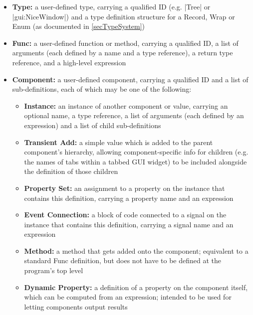 \documentclass[11pt]{report}
\begin{document}
\begin{itemize}
    \item \textbf{Type:} a user-defined type, carrying a qualified ID (e.g. |Tree| or |gui:NiceWindow|) and a type definition structure for a Record, Wrap or Enum (as documented in \cref{secTypeSystem})
    
    \item \textbf{Func:} a user-defined function or method, carrying a qualified ID, a list of arguments (each defined by a name and a type reference), a return type reference, and a high-level expression
    
    \item \textbf{Component:} a user-defined component, carrying a qualified ID and a list of sub-definitions, each of which may be one of the following:
    
    \begin{itemize}
        \item \textbf{Instance:} an instance of another component or value, carrying an optional name, a type reference, a list of arguments (each defined by an expression) and a list of child sub-definitions
        
        \item \textbf{Transient Add:} a simple value which is added to the parent component's hierarchy, allowing component-specific info for children (e.g. the names of tabs within a tabbed GUI widget) to be included alongside the definition of those children
        
        \item \textbf{Property Set:} an assignment to a property on the instance that contains this definition, carrying a property name and an expression
        
        \item \textbf{Event Connection:} a block of code connected to a signal on the instance that contains this definition, carrying a signal name and an expression
        
        \item \textbf{Method:} a method that gets added onto the component; equivalent to a standard Func definition, but does not have to be defined at the program's top level

        \item \textbf{Dynamic Property:} a definition of a property on the component itself, which can be computed from an expression; intended to be used for letting components output results
    \end{itemize}
\end{itemize}
\end{document}
